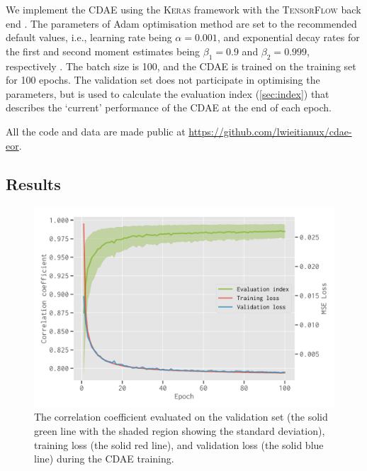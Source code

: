 \documentclass[letters,a4paper,fleqn,usenatbib]{mnras}
\begin{document}
We implement the CDAE using the \textsc{Keras} framework \citep{keras}
with the \textsc{TensorFlow} back end \citep{tensorflow}.
The parameters of Adam optimisation method are set to the recommended
default values, i.e., learning rate being $\alpha = 0.001$, and
exponential decay rates for the first and second moment estimates being
$\beta_1 = 0.9$ and $\beta_2 = 0.999$, respectively \citep{kingma2015}.
The batch size is 100, and the CDAE is trained on the training set
for 100 epochs.
The validation set does not participate in optimising the parameters,
but is used to calculate the evaluation index (\autoref{sec:index})
that describes the `current' performance of the CDAE at the end of
each epoch.

All the code and data are made public at
\url{https://github.com/lwieitianux/cdae-eor}.


\subsection{Results}
\label{sec:results}

\begin{figure}
  \centering
  \includegraphics[width=\columnwidth]{cdae-train}
  \caption{\label{fig:train}%
    The correlation coefficient evaluated on the validation set (the
    solid green line with the shaded region showing the standard
    deviation), training loss (the solid red line), and validation loss
    (the solid blue line) during the CDAE training.
  }
\end{figure}
\end{document}
